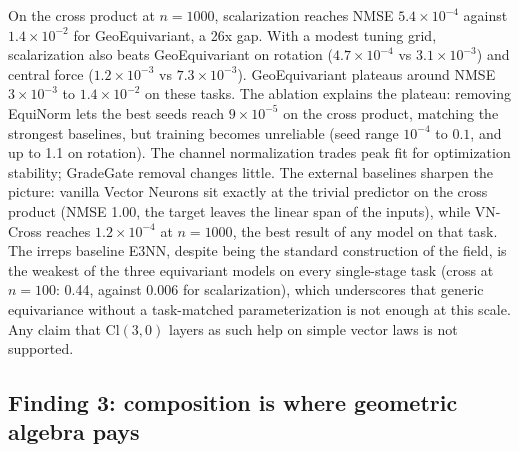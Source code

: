 \documentclass[11pt]{article}
\begin{document}
On the cross product at $n{=}1000$, scalarization reaches NMSE
$5.4\times 10^{-4}$ against $1.4\times 10^{-2}$ for GeoEquivariant, a 26x gap.
With a modest tuning grid, scalarization also beats GeoEquivariant on rotation
($4.7\times 10^{-4}$ vs $3.1\times 10^{-3}$) and central force
($1.2\times 10^{-3}$ vs $7.3\times 10^{-3}$). GeoEquivariant plateaus around
NMSE $3\times 10^{-3}$ to $1.4\times 10^{-2}$ on these tasks. The ablation
explains the plateau: removing EquiNorm lets the best seeds reach
$9\times 10^{-5}$ on the cross product, matching the strongest baselines, but
training becomes unreliable (seed range $10^{-4}$ to $0.1$, and up to 1.1 on
rotation). The channel normalization trades peak fit for optimization
stability; GradeGate removal changes little. The external
baselines sharpen the picture: vanilla Vector Neurons sit exactly at the
trivial predictor on the cross product (NMSE 1.00, the target leaves the
linear span of the inputs), while VN-Cross reaches $1.2\times 10^{-4}$ at
$n{=}1000$, the best result of any model on that task. The irreps baseline
E3NN, despite being the standard construction of the field, is the weakest of
the three equivariant models on every single-stage task (cross at $n{=}100$:
0.44, against 0.006 for scalarization), which underscores that generic
equivariance without a task-matched parameterization is not enough at this
scale. Any claim that $\mathrm{Cl}(3,0)$ layers as such help on simple vector
laws is not supported.

\subsection{Finding 3: composition is where geometric algebra pays}
\end{document}
